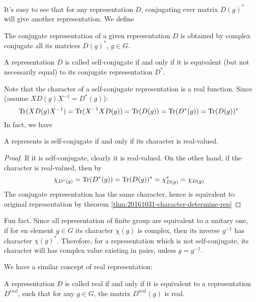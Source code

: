 It's easy to see that for any representation $D$, conjugating ever
matrix $D(g)^*$ will give another representation. We define
\begin{defi}
    The conjugate representation of a given representation $D$ is obtained
    by complex conjugate all its matrices $D(g)^*,\,g\in G$.
\end{defi}
\begin{defi}
    A representation $D$ is called self-conjugate if and only if it is
    equivalent (but not necessarily equal) to its conjugate
    representation $D^*$.
\end{defi}
Note that the character of a self-conjugate representation is a real
function. Since (assume $XD(g)X^{-1}=D^*(g)$):
$$
    \operatorname{Tr}(XD(g)X^{-1}) = \operatorname{Tr}(X^{-1}XD(g)) = \operatorname{Tr}(D(g)) = \operatorname{Tr}(D^*(g))
    = \operatorname{Tr}(D(g))^*
$$
In fact, we have
\begin{thm}
    A represents is self-conjugate if and only if its character is
    real-valued.
\end{thm}
\begin{proof}
    If it is self-conjugate, clearly it is real-valued. On the other
    hand, if the character is real-valued, then by
    \begin{equation}
        \chi_{D^*(g)} = \operatorname{Tr}(D^*(g)) = \operatorname{Tr}(D(g))^* = \chi^*_{D(g)}
        = \chi_{D(g)}
    \end{equation}
    The conjugate representation has the same character, hence is
    equivalent to original representation by theorem \ref{thm:20161031-character-determine-rep}
\end{proof}

Fun fact. Since all representation of finite group are equivalent to a
unitary one, if for en element $g\in G$ its character $\chi(g)$ is
complex, then its inverse $g^{-1}$ has character $\chi(g)^*$.
Therefore, for a representation which is not self-conjugate, its
character will has complex value existing in pairs, unless $g=g^{-1}$.

We have a similar concept of real representation:
\begin{defi}
    A representation $D$ is called real if and only if it is
    equivalent to a representation $D^\text{real}$, such that for any
    $g\in G$, the matrix $D^\text{real}(g)$ is real.
\end{defi}


